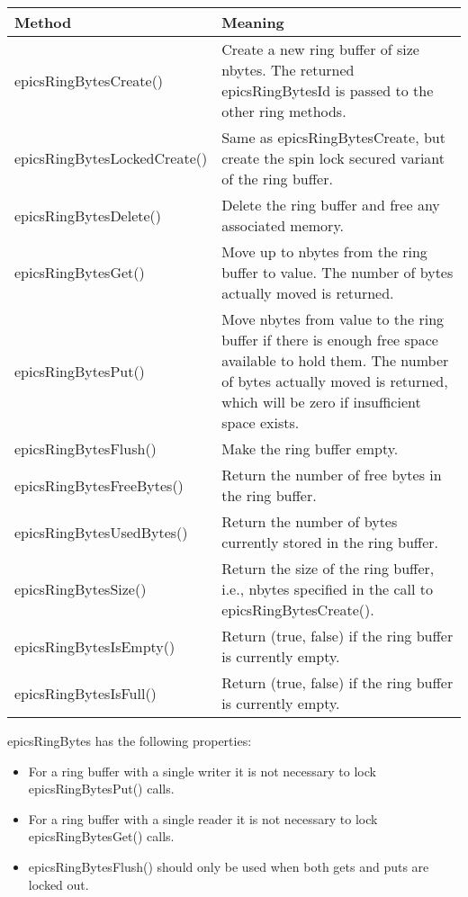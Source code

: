 \begin{center}
\begin{longtable}{p{1.75in}p{4.25in}}
\textbf{Method} & \textbf{Meaning}\\
\hline
epicsRingBytesCreate() & Create a new ring buffer of size nbytes. The returned epicsRingBytesId is passed to the other ring methods.\\
epicsRingBytesLockedCreate() & Same as epicsRingBytesCreate, but create the spin lock secured variant of the ring buffer.\\
epicsRingBytesDelete() & Delete the ring buffer and free any associated memory.\\
epicsRingBytesGet() & Move up to nbytes from the ring buffer to value. The number of bytes actually moved is returned.\\
epicsRingBytesPut() & Move nbytes from value to the ring buffer if there is enough free space available to hold them. The number of bytes actually moved is returned, which will be zero if insufficient space exists.\\
epicsRingBytesFlush() & Make the ring buffer empty.\\
epicsRingBytesFreeBytes() & Return the number of free bytes in the ring buffer.\\
epicsRingBytesUsedBytes() & Return the number of bytes currently stored in the ring buffer.\\
epicsRingBytesSize() & Return the size of the ring buffer, i.e., nbytes specified in the call to epicsRingBytesCreate().\\
epicsRingBytesIsEmpty() & Return (true, false) if the ring buffer is currently empty.\\
epicsRingBytesIsFull() & Return (true, false) if the ring buffer is currently empty.
\end{longtable}

\end{center}


epicsRingBytes has the following properties:

\begin{itemize}
\item For a ring buffer with a single writer it is not necessary to lock epicsRingBytesPut() calls.

\item For a ring buffer with a single reader it is not necessary to lock epicsRingBytesGet() calls.

\item epicsRingBytesFlush() should only be used when both gets and puts are locked out.

\end{itemize}


